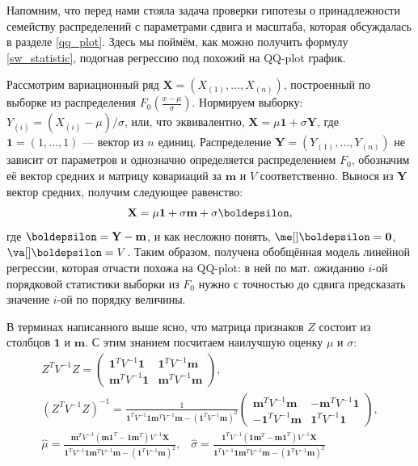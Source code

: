{\small
\begin{example}\label{proof_of_sw}
    Напомним, что перед нами стояла задача проверки гипотезы о принадлежности семейству распределений с параметрами сдвига и масштаба, которая обсуждалась в разделе \ref{qq_plot}. Здесь мы поймём, как можно получить формулу \eqref{sw_statistic}, подогнав регрессию под похожий на QQ-plot график.
    
    Рассмотрим вариационный ряд $\mathbf X = (X_{(1)}, \ldots, X_{(n)})$, построенный по выборке из распределения $F_0\left(\frac{x-\mu}{\sigma}\right)$. Нормируем выборку: $Y_{(i)} = (X_{(i)} - \mu) / \sigma$, или, что эквивалентно, $\mathbf X = \mu \mathbf{1} + \sigma \mathbf Y$, где $\mathbf{1} = (1, \ldots, 1)$ --- вектор из $n$ единиц. Распределение $\mathbf Y = (Y_{(1)}, \ldots, Y_{(n)})$ не зависит от параметров и однозначно определяется распределением $F_0$, обозначим её вектор средних и матрицу ковариаций за $\mathbf{m}$ и $V$ соответственно. Вынося из $\mathbf Y$ вектор средних, получим следующее равенство:
    \[
    \mathbf X = \mu \mathbf{1} + \sigma \mathbf{m} + \sigma \boldepsilon,
    \]
    где $\boldepsilon = \mathbf Y - \mathbf{m}$, и как несложно понять, $\me[]\boldepsilon = \mathbf{0}$, $\va[] \boldepsilon = V$. Таким образом, получена обобщённая модель линейной регрессии, которая отчасти похожа на QQ-plot: в ней по мат. ожиданию $i$-ой порядковой статистики выборки из $F_0$ нужно с точностью до сдвига предсказать значение $i$-ой по порядку величины.

    В терминах написанного выше ясно, что матрица признаков $Z$ состоит из столбцов $\mathbf{1}$ и $\mathbf{m}$. С этим знанием посчитаем наилучшую оценку $\mu$ и $\sigma$:
    \begin{gather*}
        Z^TV^{-1}Z =
        \begin{pmatrix}
            \mathbf{1}^T V^{-1} \mathbf{1} & \mathbf{1}^T V^{-1} \mathbf{m}\\
            \mathbf{m}^T V^{-1} \mathbf{1} & \mathbf{m}^T V^{-1} \mathbf{m}
        \end{pmatrix},\\
        \left(Z^TV^{-1}Z\right)^{-1} = \frac{1}{\mathbf{1}^T V^{-1} \mathbf{1}\mathbf{m}^T V^{-1} \mathbf{m} - (\mathbf{1}^T V^{-1} \mathbf{m})^2}
        \begin{pmatrix}
            \mathbf{m}^T V^{-1} \mathbf{m} & -\mathbf{m}^T V^{-1} \mathbf{1}\\
            -\mathbf{1}^T V^{-1} \mathbf{m} &  \mathbf{1}^T V^{-1} \mathbf{1}
        \end{pmatrix},\\
        \widehat{\mu} = \frac{\mathbf{m}^TV^{-1}(\mathbf{m}\mathbf{1}^T - \mathbf{1}\mathbf{m}^T)V^{-1}\mathbf X}{\mathbf{1}^T V^{-1} \mathbf{1}\mathbf{m}^T V^{-1} \mathbf{m} - (\mathbf{1}^T V^{-1} \mathbf{m})^2},\;\;\;
        \widehat{\sigma} = \frac{\mathbf{1}^TV^{-1}(\mathbf{1}\mathbf{m}^T -  \mathbf{m}\mathbf{1}^T)V^{-1}\mathbf X}{\mathbf{1}^T V^{-1} \mathbf{1}\mathbf{m}^T V^{-1} \mathbf{m} - (\mathbf{1}^T V^{-1} \mathbf{m})^2}
    \end{gather*}


\end{example}}
